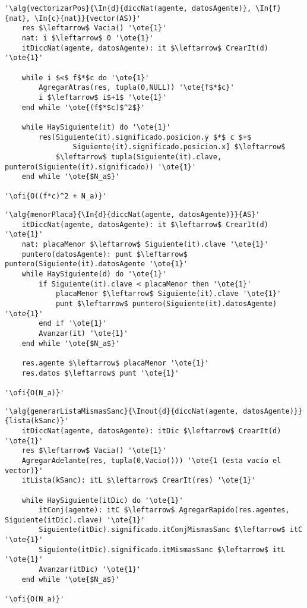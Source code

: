 \begin{lstlisting}[mathescape]
'\alg{vectorizarPos}{\In{d}{diccNat(agente, datosAgente)}, \In{f}{nat}, \In{c}{nat}}{vector(AS)}'
	res $\leftarrow$ Vacia() '\ote{1}'
	nat: i $\leftarrow$ 0 '\ote{1}'
	itDiccNat(agente, datosAgente): it $\leftarrow$ CrearIt(d) '\ote{1}'

	while i $<$ f$*$c do '\ote{1}'
		AgregarAtras(res, tupla(0,NULL)) '\ote{f$*$c}'
		i $\leftarrow$ i$+1$ '\ote{1}'
	end while '\ote{(f$*$c)$^2$}'

	while HaySiguiente(it) do '\ote{1}'
		res[Siguiente(it).significado.posicion.y $*$ c $+$
				Siguiente(it).significado.posicion.x] $\leftarrow$
			$\leftarrow$ tupla(Siguiente(it).clave, puntero(Siguiente(it).significado)) '\ote{1}'
	end while '\ote{$N_a$}'

'\ofi{O((f*c)^2 + N_a)}'
\end{lstlisting}

\begin{lstlisting}[mathescape]
'\alg{menorPlaca}{\In{d}{diccNat(agente, datosAgente)}}{AS}'
	itDiccNat(agente, datosAgente): it $\leftarrow$ CrearIt(d) '\ote{1}'
	nat: placaMenor $\leftarrow$ Siguiente(it).clave '\ote{1}'
	puntero(datosAgente): punt $\leftarrow$ puntero(Siguiente(it).datosAgente '\ote{1}'
	while HaySiguiente(d) do '\ote{1}'
		if Siguiente(it).clave < placaMenor	then '\ote{1}'
			placaMenor $\leftarrow$ Siguiente(it).clave '\ote{1}'
			punt $\leftarrow$ puntero(Siguiente(it).datosAgente) '\ote{1}'
		end if '\ote{1}'
		Avanzar(it) '\ote{1}'
	end while '\ote{$N_a$}'

	res.agente $\leftarrow$ placaMenor '\ote{1}'
	res.datos $\leftarrow$ punt '\ote{1}'

'\ofi{O(N_a)}'
\end{lstlisting}

\begin{lstlisting}[mathescape]
'\alg{generarListaMismasSanc}{\Inout{d}{diccNat(agente, datosAgente)}}{lista(kSanc)}'
	itDiccNat(agente, datosAgente): itDic $\leftarrow$ CrearIt(d) '\ote{1}'
	res $\leftarrow$ Vacia() '\ote{1}'
	AgregarAdelante(res, tupla(0,Vacio())) '\ote{1 (esta vacío el vector)}'
	itLista(kSanc): itL $\leftarrow$ CrearIt(res) '\ote{1}'

	while HaySiguiente(itDic) do '\ote{1}'
		itConj(agente): itC $\leftarrow$ AgregarRapido(res.agentes, Siguiente(itDic).clave) '\ote{1}'
		Siguiente(itDic).significado.itConjMismasSanc $\leftarrow$ itC '\ote{1}'
		Siguiente(itDic).significado.itMismasSanc $\leftarrow$ itL '\ote{1}'
		Avanzar(itDic) '\ote{1}'
	end while '\ote{$N_a$}'

'\ofi{O(N_a)}'
\end{lstlisting}


